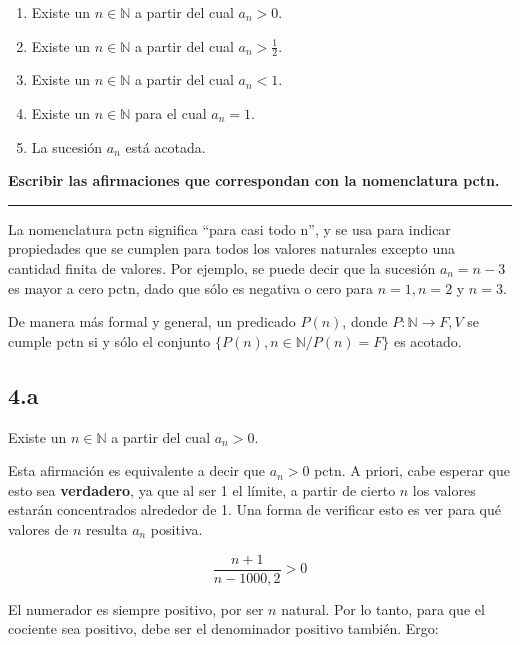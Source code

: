 \documentclass{article}
\newcommand{\subsectionx}[1]{\subsection*{#1}\label{subsec:#1}\addcontentsline{toc}{subsection}{\nameref{subsec:#1}}}
\begin{document}
\begin{enumerate}[label=(\alph*)]

\bfseries

\item Existe un $ n \in \mathbb{N} $ a partir del cual $ a_n > 0 $.

\item Existe un $ n \in \mathbb{N} $ a partir del cual $ a_n > \frac{1}{2} $.

\item Existe un $ n \in \mathbb{N} $ a partir del cual $ a_n < 1 $.

\item Existe un $ n \in \mathbb{N} $ para el cual $ a_n = 1 $.

\item La sucesión $ a_n $ está acotada.

\end{enumerate}

\textbf{ Escribir las afirmaciones que correspondan con la nomenclatura pctn. }

\vspace{1em}
\hrule
\vspace{1em}

La nomenclatura pctn significa ``para casi todo n'', y se usa para indicar propiedades que se cumplen para todos los valores naturales excepto una cantidad finita de valores. Por ejemplo, se puede decir que la sucesión $ a_n = n-3 $ es mayor a cero pctn, dado que sólo es negativa o cero para $ n = 1, n=2 $ y $n=3$.

De manera más formal y general, un predicado $P(n)$, donde $P:\mathbb{N} \rightarrow {F, V}$ se cumple pctn si y sólo el conjunto $ \{ P(n), n \in \mathbb{N} / P(n) = F  \} $ es acotado.

\subsectionx{4.a}

Existe un $ n \in \mathbb{N} $ a partir del cual $ a_n > 0 $.

Esta afirmación es equivalente a decir que $ a_n > 0 $ pctn. A priori, cabe esperar que esto sea \textbf{verdadero}, ya que al ser 1 el límite, a partir de cierto $ n $ los valores estarán concentrados alrededor de 1. Una forma de verificar esto es ver para qué valores de $ n $ resulta $ a_n $ positiva.

\begin{equation}
\frac{n+1}{n-1000, 2} > 0
\end{equation}

El numerador es siempre positivo, por ser $ n $ natural. Por lo tanto, para que el cociente sea positivo, debe ser el denominador positivo también. Ergo:
\end{document}
